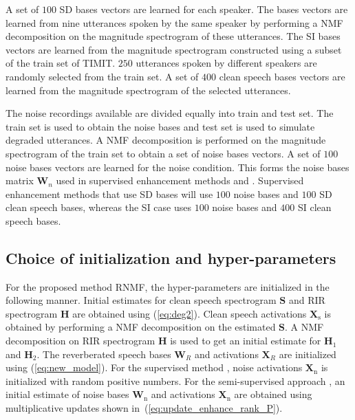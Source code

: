 A set of $100$ SD bases vectors are learned for each speaker. The bases vectors are learned from nine utterances spoken by the same speaker
by performing a NMF decomposition on the magnitude spectrogram of these utterances. The SI bases vectors are learned from the magnitude spectrogram constructed using a subset of the train set of TIMIT. $250$ utterances spoken by different speakers are randomly selected from the train set. A set of $400$ clean speech bases vectors are learned from the magnitude spectrogram of the selected utterances. 

The noise recordings available are divided equally into train and test set. The train set is used to obtain the noise bases and test set is used to simulate degraded utterances. A NMF decomposition is performed on the magnitude spectrogram of the train set to obtain a set of noise bases vectors. A set of $100$ noise bases vectors are learned for the noise condition. This forms the noise bases matrix $\mathbf{W}_n$ used in supervised enhancement methods  and . Supervised enhancement methods that use SD bases will use $100$ noise bases and $100$ SD clean speech bases, whereas the SI case uses $100$ noise bases and $400$ SI clean speech bases.

\subsection{Choice of initialization and hyper-parameters}
For the proposed method RNMF, the hyper-parameters are initialized in the following manner.  Initial estimates for clean speech spectrogram $\mathbf{S}$ and RIR spectrogram $\mathbf{H}$ are obtained using (\ref{eq:deg2}). Clean speech activations $\mathbf{X}_{\text{s}}$ is obtained by performing a NMF decomposition on the estimated $\mathbf{S}$. A NMF decomposition on RIR spectrogram $\mathbf{H}$ is used to get an initial estimate for $\mathbf{H}_1$ and $\mathbf{H}_2$. The reverberated speech bases $\mathbf{W}_R$ and activations $\mathbf{X}_R$ are initialized using (\ref{eq:new_model}). For the supervised method , noise activations $\mathbf{X}_{\text{n}}$ is initialized with random positive numbers. For the semi-supervised approach , an initial estimate of noise bases $\mathbf{W}_{\text{n}}$ and activations $\mathbf{X}_{\text{n}}$ are obtained using multiplicative updates shown in~(\ref{eq:update_enhance_rank_P}).

